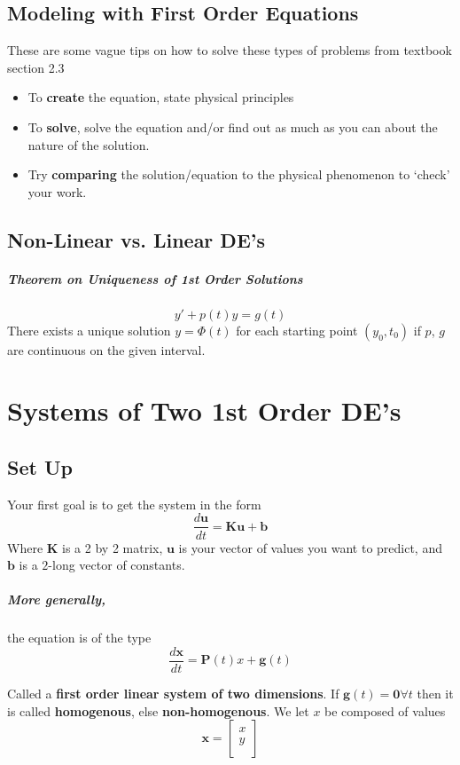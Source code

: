 \documentclass[a4paper,12pt]{report}
\begin{document}
\section{Modeling with First Order Equations}
These are some vague tips on how to solve these types of problems from textbook section 
2.3
\begin{itemize}
\item To \textbf{create} the equation, state physical principles
\item To \textbf{solve}, solve the equation and/or find out as much as you can about the nature of the solution.
\item Try \textbf{comparing} the solution/equation to the physical phenomenon to `check' your work.
\end{itemize}

\section{Non-Linear vs. Linear DE's}
\paragraph{Theorem on Uniqueness of 1st Order Solutions}
$$y' + p(t)y = g(t)$$
There exists a unique solution $y=\Phi(t)$ for each starting point $(y_0, t_0)$ if 
$p$, $g$ are continuous on the given interval.

\chapter{Systems of Two 1st Order DE's}
\section{Set Up}
Your first goal is to get the system in the form $$\frac{d \pmb{u}}{dt} = \pmb{Ku + b}$$
Where $\pmb{K}$ is a 2 by 2 matrix, $\pmb{u}$ is your vector of values you want to 
predict, and $\pmb{b}$ is a $2$-long vector of constants.

\paragraph{More generally, } the equation is of the type 
$$\frac{d\pmb{x}}{dt} = \pmb{P}(t)x + \pmb{g}(t)$$

Called a \textbf{first order linear system of two dimensions}. If $\pmb{g}(t) = \pmb{0} \forall t$ 
then it is called \textbf{homogenous}, else \textbf{non-homogenous}. We let $x$ be composed
of values $$\pmb{x} = \begin{bmatrix}
                           x \\
                           y \\
                      \end{bmatrix}$$
\end{document}
